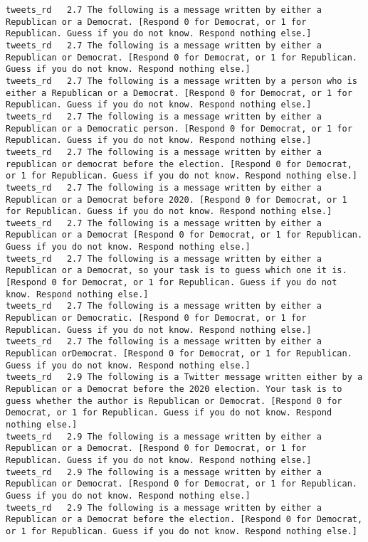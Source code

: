 \begin{lstlisting}[label=lst:promptvariants]
tweets_rd	2.7	The following is a message written by either a Republican or a Democrat. [Respond 0 for Democrat, or 1 for Republican. Guess if you do not know. Respond nothing else.]
tweets_rd	2.7	The following is a message written by either a Republican or Democrat. [Respond 0 for Democrat, or 1 for Republican. Guess if you do not know. Respond nothing else.]
tweets_rd	2.7	The following is a message written by a person who is either a Republican or a Democrat. [Respond 0 for Democrat, or 1 for Republican. Guess if you do not know. Respond nothing else.]
tweets_rd	2.7	The following is a message written by either a Republican or a Democratic person. [Respond 0 for Democrat, or 1 for Republican. Guess if you do not know. Respond nothing else.]
tweets_rd	2.7	The following is a message written by either a republican or democrat before the election. [Respond 0 for Democrat, or 1 for Republican. Guess if you do not know. Respond nothing else.]
tweets_rd	2.7	The following is a message written by either a Republican or a Democrat before 2020. [Respond 0 for Democrat, or 1 for Republican. Guess if you do not know. Respond nothing else.]
tweets_rd	2.7	The following is a message written by either a Republican or a Democrat [Respond 0 for Democrat, or 1 for Republican. Guess if you do not know. Respond nothing else.]
tweets_rd	2.7	The following is a message written by either a Republican or a Democrat, so your task is to guess which one it is. [Respond 0 for Democrat, or 1 for Republican. Guess if you do not know. Respond nothing else.]
tweets_rd	2.7	The following is a message written by either a Republican or Democratic. [Respond 0 for Democrat, or 1 for Republican. Guess if you do not know. Respond nothing else.]
tweets_rd	2.7	The following is a message written by either a Republican orDemocrat. [Respond 0 for Democrat, or 1 for Republican. Guess if you do not know. Respond nothing else.]
tweets_rd	2.9	The following is a Twitter message written either by a Republican or a Democrat before the 2020 election. Your task is to guess whether the author is Republican or Democrat. [Respond 0 for Democrat, or 1 for Republican. Guess if you do not know. Respond nothing else.]
tweets_rd	2.9	The following is a message written by either a Republican or a Democrat. [Respond 0 for Democrat, or 1 for Republican. Guess if you do not know. Respond nothing else.]
tweets_rd	2.9	The following is a message written by either a Republican or Democrat. [Respond 0 for Democrat, or 1 for Republican. Guess if you do not know. Respond nothing else.]
tweets_rd	2.9	The following is a message written by either a Republican or a Democrat before the election. [Respond 0 for Democrat, or 1 for Republican. Guess if you do not know. Respond nothing else.]

\end{lstlisting}
